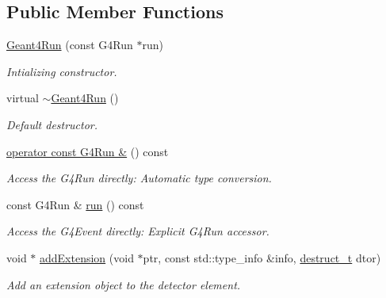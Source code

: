 \subsection*{Public Member Functions}
\begin{DoxyCompactItemize}
\item 
\hyperlink{class_d_d4hep_1_1_simulation_1_1_geant4_run_a93e0b66a97b9b04f65c1d59882d248f3}{Geant4Run} (const G4Run $\ast$run)
\begin{DoxyCompactList}\small\item\em Intializing constructor. \item\end{DoxyCompactList}\item 
virtual \hyperlink{class_d_d4hep_1_1_simulation_1_1_geant4_run_a9a508d7ab8cb68013b9e3cd370c2374a}{$\sim$Geant4Run} ()
\begin{DoxyCompactList}\small\item\em Default destructor. \item\end{DoxyCompactList}\item 
\hyperlink{class_d_d4hep_1_1_simulation_1_1_geant4_run_a635bb2bb80bd8c1933448f6700daf9d7}{operator const G4Run \&} () const 
\begin{DoxyCompactList}\small\item\em Access the G4Run directly: Automatic type conversion. \item\end{DoxyCompactList}\item 
const G4Run \& \hyperlink{class_d_d4hep_1_1_simulation_1_1_geant4_run_a4b60ea2ba284b36a1e76eba1b5379dca}{run} () const 
\begin{DoxyCompactList}\small\item\em Access the G4Event directly: Explicit G4Run accessor. \item\end{DoxyCompactList}\item 
void $\ast$ \hyperlink{class_d_d4hep_1_1_simulation_1_1_geant4_run_aa825451bec9637a51d98d46e23334b75}{addExtension} (void $\ast$ptr, const std::type\_\-info \&info, \hyperlink{class_d_d4hep_1_1_object_extensions_af9ca2813f0d7fa65ac13d905d9721cdf}{destruct\_\-t} dtor)
\begin{DoxyCompactList}\small\item\em Add an extension object to the detector element. \item\end{DoxyCompactList}\item 

\end{DoxyCompactItemize}

